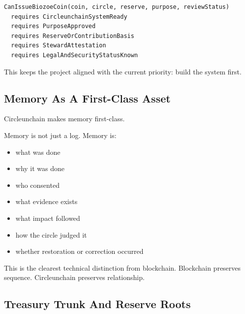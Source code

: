 ﻿\documentclass[12pt]{article}
\begin{document}
\begin{verbatim}
CanIssueBiozoeCoin(coin, circle, reserve, purpose, reviewStatus)
  requires CircleunchainSystemReady
  requires PurposeApproved
  requires ReserveOrContributionBasis
  requires StewardAttestation
  requires LegalAndSecurityStatusKnown
\end{verbatim}

This keeps the project aligned with the current priority: build the system first.

\subsection{Memory As A First-Class Asset}


Circleunchain makes memory first-class.

Memory is not just a log. Memory is:

\begin{itemize}
  \item what was done
\end{itemize}
\begin{itemize}
  \item why it was done
\end{itemize}
\begin{itemize}
  \item who consented
\end{itemize}
\begin{itemize}
  \item what evidence exists
\end{itemize}
\begin{itemize}
  \item what impact followed
\end{itemize}
\begin{itemize}
  \item how the circle judged it
\end{itemize}
\begin{itemize}
  \item whether restoration or correction occurred
\end{itemize}

This is the clearest technical distinction from blockchain. Blockchain preserves sequence. Circleunchain preserves relationship.

\subsection{Treasury Trunk And Reserve Roots}
\end{document}
